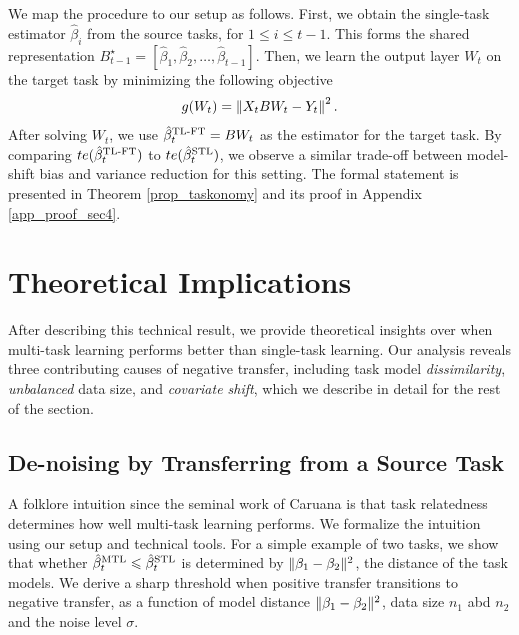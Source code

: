 We map the procedure to our setup as follows.
First, we obtain the single-task estimator $\hat{\beta}_i$ from the source tasks, for $1\le i \le t-1$.
This forms the shared representation $B^{\star}_{t-1} = [\hat{\beta}_1,\hat{\beta}_2,\dots,\hat{\beta}_{t-1}]$.
Then, we learn the output layer $W_t$ on the target task by minimizing the following objective
\begin{align}
	g(W_t) = \left\| X_t B W_t - Y_t \right\|^2.
\end{align}
After solving $W_t$, we use $\hat{\beta}_t^{\text{TL-FT}} = B W_t$ as the estimator for the target task.
By comparing $te(\hat{\beta}_t^{\text{TL-FT}})$ to $te(\hat{\beta}_t^{\text{STL}})$, we observe a similar trade-off between model-shift bias and variance reduction for this setting.
The formal statement is presented in Theorem \ref{prop_taskonomy} and its proof in Appendix \ref{app_proof_sec4}.



\section{Theoretical Implications}
\label{sec_insight}

After describing this technical result, we provide theoretical insights over when multi-task learning performs better than single-task learning.
Our analysis reveals three contributing causes of negative transfer, including task model \textit{dissimilarity}, \textit{unbalanced} data size, and \textit{covariate shift}, which we describe in detail for the rest of the section.


\subsection{De-noising by Transferring from a Source Task}\label{sec_similarity}

A folklore intuition since the seminal work of Caruana \cite{C97} is that task relatedness determines how well multi-task learning performs.
We formalize the intuition using our setup and technical tools.
For a simple example of two tasks, we show that whether $\hat{\beta}_t^{\text{MTL}} \leqslant \hat{\beta}_t^{\text{STL}}$ is determined by $\|\beta_1 - \beta_2\|^2$, the distance of the task models.
We derive a sharp threshold when positive transfer transitions to negative transfer, as a function of model distance $\|\beta_1 - \beta_2\|^2$, data size $n_1$ abd $n_2$ and the noise level $\sigma$.

